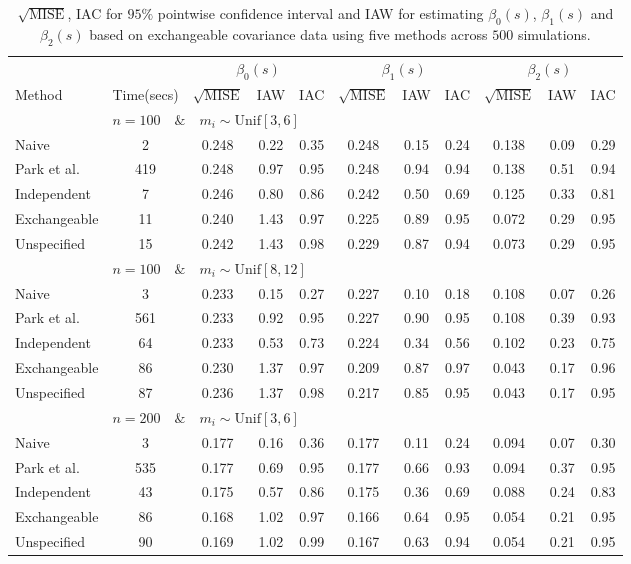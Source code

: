 \documentclass[submit]{smj}
\begin{document}
\begin{table}
	\centering
	\caption{$\sqrt{\text{MISE}}$, IAC for $95\%$ pointwise confidence interval and IAW for estimating $\beta_0(s)$, $\beta_1(s)$ and $\beta_2(s)$ based on exchangeable covariance data using five methods across $500$ simulations.}
	\label{tab:linear4}
	\begin{adjustbox}{width=\textwidth}
	\begin{tabular}{l|cccccccccc}
		\hline
		&& \multicolumn{3}{c}{$\beta_0(s)$} & \multicolumn{3}{c}{$\beta_1(s)$} &  \multicolumn{3}{c}{$\beta_2(s)$}    \\
		Method &Time(secs)& $\sqrt{\text{MISE}}$ & IAW & IAC & $\sqrt{\text{MISE}}$ & IAW & IAC &  $\sqrt{\text{MISE}}$ & IAW & IAC    \\
		\hline
		& \multicolumn{10}{l}{$n=100 \quad\& \quad m_i \sim  \text{Unif}[3,6]$}\\				
		Naive& 2 & 0.248 & 0.22 & 0.35 & 0.248 & 0.15 & 0.24 & 0.138 & 0.09 & 0.29 \\ 
		Park et al.& 419 & 0.248 & 0.97 & 0.95 & 0.248 & 0.94 & 0.94 & 0.138 & 0.51 & 0.94 \\ 
		Independent & 7& 0.246 & 0.80 & 0.86 & 0.242 & 0.50 & 0.69 & 0.125 & 0.33 & 0.81 \\ 
		Exchangeable & 11 & 0.240 & 1.43 & 0.97 & 0.225 & 0.89 & 0.95 & 0.072 & 0.29 & 0.95 \\ 
		Unspecified & 15& 0.242 & 1.43 & 0.98 & 0.229 & 0.87 & 0.94 & 0.073 & 0.29 & 0.95 \\ 
		
		& \multicolumn{10}{l}{$n=100 \quad\& \quad m_i \sim \text{Unif}[8,12]$}\\
		Naive& 3& 0.233 & 0.15 & 0.27 & 0.227 & 0.10 & 0.18 & 0.108 & 0.07 & 0.26 \\ 
		Park et al.& 561 & 0.233 & 0.92 & 0.95 & 0.227 & 0.90 & 0.95 & 0.108 & 0.39 & 0.93 \\ 
		Independent & 64& 0.233 & 0.53 & 0.73 & 0.224 & 0.34 & 0.56 & 0.102 & 0.23 & 0.75 \\ 
		Exchangeable & 86 & 0.230 & 1.37 & 0.97 & 0.209 & 0.87 & 0.97 & 0.043 & 0.17 & 0.96 \\ 
		Unspecified & 87& 0.236 & 1.37 & 0.98 & 0.217 & 0.85 & 0.95 & 0.043 & 0.17 & 0.95 \\ 
		
		& \multicolumn{10}{l}{$n=200 \quad\& \quad m_i \sim  \text{Unif}[3,6]$}\\
		Naive & 3&  0.177 & 0.16 & 0.36 & 0.177 & 0.11 & 0.24 & 0.094 & 0.07 & 0.30 \\ 
		Park et al.& 535& 0.177 & 0.69 & 0.95 & 0.177 & 0.66 & 0.93 & 0.094 & 0.37 & 0.95 \\ 
		Independent & 43& 0.175 & 0.57 & 0.86 & 0.175 & 0.36 & 0.69 & 0.088 & 0.24 & 0.83 \\ 
		Exchangeable & 86& 0.168 & 1.02 & 0.97 & 0.166 & 0.64 & 0.95 & 0.054 & 0.21 & 0.95 \\ 
		Unspecified & 90& 0.169 & 1.02 & 0.99 & 0.167 & 0.63 & 0.94 & 0.054 & 0.21 & 0.95 \\
		

\end{tabular}
\end{adjustbox}
\end{table}
\end{document}
